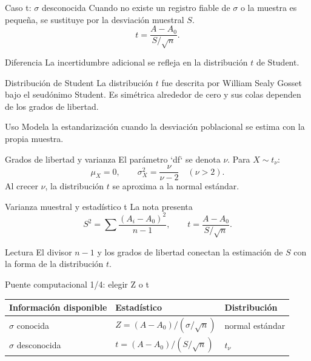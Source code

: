 \documentclass[10pt,aspectratio=169]{beamer}
\begin{document}
\begin{frame}{Caso t: $\sigma$ desconocida}
  \footnotesize
  Cuando no existe un registro fiable de $\sigma$ o la muestra es pequeña,
  se sustituye por la desviación muestral $S$.
  \[
    t=\frac{A-A_0}{S/\sqrt n}.
  \]
  \begin{alertblock}{Diferencia}
    La incertidumbre adicional se refleja en la distribución $t$ de Student.
  \end{alertblock}
\end{frame}

\begin{frame}{Distribución de Student}
  \footnotesize
  La distribución $t$ fue descrita por William Sealy Gosset bajo el seudónimo
  Student. Es simétrica alrededor de cero y sus colas dependen de los grados de
  libertad.
  \begin{block}{Uso}
    Modela la estandarización cuando la desviación poblacional se estima con la
    propia muestra.
  \end{block}
\end{frame}

\begin{frame}{Grados de libertad y varianza}
  \footnotesize
  El parámetro `df` se denota $\nu$. Para $X\sim t_\nu$:
  \[
    \mu_X=0,\qquad \sigma_X^2=\frac{\nu}{\nu-2}
    \quad(\nu>2).
  \]
  Al crecer $\nu$, la distribución $t$ se aproxima a la normal estándar.
\end{frame}

\begin{frame}{Varianza muestral y estadístico t}
  \footnotesize
  La nota presenta
  \[
    S^2=\sum\frac{(A_i-A_0)^2}{n-1},
    \qquad t=\frac{A-A_0}{S/\sqrt n}.
  \]
  \begin{alertblock}{Lectura}
    El divisor $n-1$ y los grados de libertad conectan la estimación de $S$ con
    la forma de la distribución $t$.
  \end{alertblock}
\end{frame}

\begin{frame}{Puente computacional 1/4: elegir Z o t}
  \footnotesize
  \begin{tabular}{lll}
    \hline
    Información disponible & Estadístico & Distribución \\
    \hline
    $\sigma$ conocida & $Z=(A-A_0)/(\sigma/\sqrt n)$ & normal estándar \\
    $\sigma$ desconocida & $t=(A-A_0)/(S/\sqrt n)$ & $t_\nu$ \\
    \hline
  \end{tabular}
\end{frame}
\end{document}
